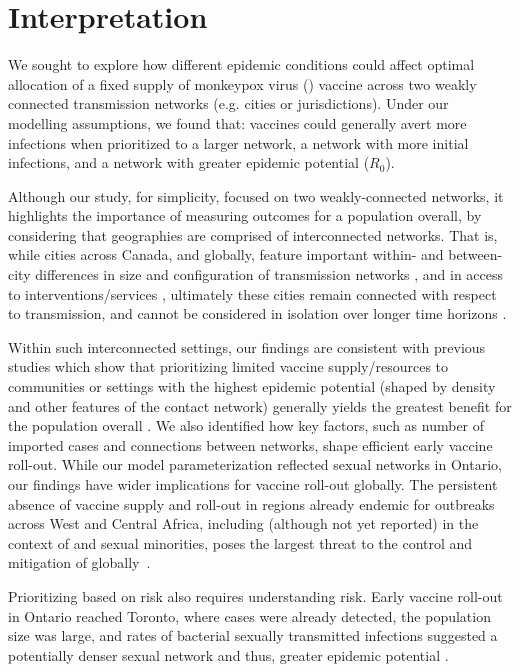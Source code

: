 \section{Interpretation}
We sought to explore how different epidemic conditions
could affect optimal allocation of a fixed supply of monkeypox virus (\MPXV) vaccine
across two weakly connected transmission networks (e.g. cities or jurisdictions).
Under our modelling assumptions, we found that:
vaccines could generally avert more infections when prioritized to
a larger network,
a network with more initial infections, and
a network with greater epidemic potential ($R_0$).
\par
Although our study, for simplicity, focused on two weakly-connected networks,
it highlights the importance of measuring outcomes for a population overall,
by considering that geographies are comprised of interconnected networks.
That is, while cities across Canada, and globally,
feature important within- and between-city differences
in size and configuration of transmission networks \cite{},
and in access to interventions/services \cite{},
ultimately these cities remain connected with respect to transmission,
and cannot be considered in isolation over longer time horizons \cite{}.
\par
Within such interconnected settings,
our findings are consistent with previous studies which show that
prioritizing limited vaccine supply/resources to communities or settings
with the highest epidemic potential (shaped by density and other features of the contact network)
generally yields the greatest benefit for the population overall
\cite{Garnett2005,Anderson2014,Mishra2021}.
We also identified how key factors,
such as number of imported cases and connections between networks,
shape efficient early vaccine roll-out.
While our model parameterization reflected \GBMSM sexual networks in Ontario,
our findings have wider implications for vaccine roll-out globally.
The persistent absence of vaccine supply and roll-out in
regions already endemic for \MPXV outbreaks across West and Central Africa,
including (although not yet reported) in the context of \GBMSM and sexual minorities,
poses the largest threat to the control and mitigation of \MPXV globally~\cite{}.
\par
Prioritizing based on risk also requires understanding risk.
Early vaccine roll-out in Ontario reached Toronto,
where cases were already detected, the population size was large, and
rates of bacterial sexually transmitted infections suggested
a potentially denser sexual network and thus, greater epidemic potential \cite{Endo2022}.
